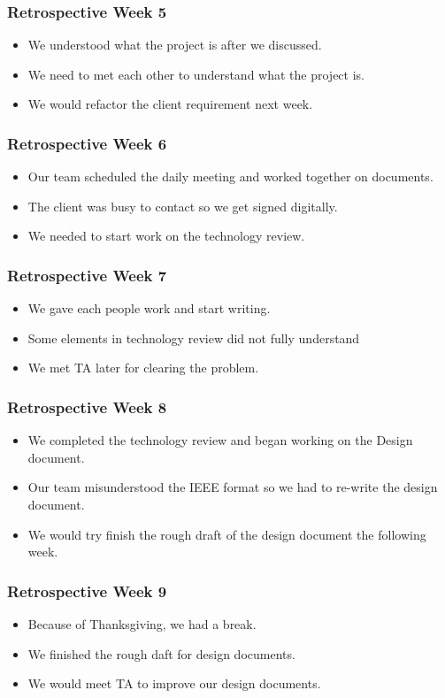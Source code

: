 \documentclass[pdf]{beamer}
\begin{document}
\begin{frame}
  \frametitle{Retrospective Week 5}
  \begin{itemize}
    \item We understood what the project is after we discussed.
    \item We need to met each other to understand what the project is.
    \item We would refactor the client requirement next week.
  \end{itemize}
\end{frame}

\begin{frame}
  \frametitle{Retrospective Week 6}
  \begin{itemize}
    \item Our team scheduled the daily meeting and worked together on documents.
    \item The client was busy to contact so we get signed digitally.
    \item We needed to start work on the technology review. 
  \end{itemize}
\end{frame}

\begin{frame}
  \frametitle{Retrospective Week 7}
  \begin{itemize}
    \item We gave each people work and start writing.
    \item Some elements in technology review did not fully understand
    \item We met TA later for clearing the problem.
  \end{itemize}
\end{frame}
 
\begin{frame}
  \frametitle{Retrospective Week 8}
  \begin{itemize}
    \item We completed the technology review and began working on the Design document. 
    \item Our team misunderstood the IEEE format so we had to re-write the design document.
    \item We would try finish the rough draft of the design document the following week. 
  \end{itemize}
\end{frame}
  
\begin{frame}
  \frametitle{Retrospective Week 9}
  \begin{itemize}
    \item Because of Thanksgiving, we had a break.
    \item We finished the rough daft for design documents.
    \item We would meet TA to improve our design documents.
  \end{itemize}
\end{frame}
\end{document}
